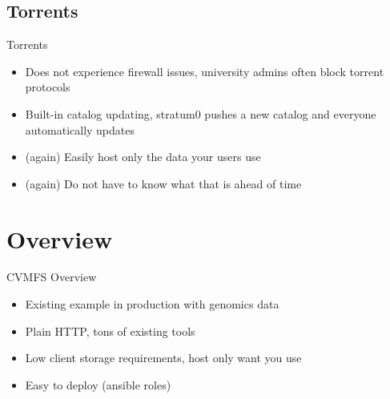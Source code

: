 \documentclass[12pt]{ufrslides}
\begin{document}
\subsection{Torrents}
\begin{frame}{Torrents}
	\begin{itemize}
		\item Does not experience firewall issues, university admins often block torrent protocols
		\item Built-in catalog updating, stratum0 pushes a new catalog and everyone automatically updates
		\item (again) Easily host only the data your users use
		\item (again) Do not have to know what that is ahead of time
	\end{itemize}
\end{frame}

\section{Overview}
\begin{frame}{CVMFS Overview}
	\begin{itemize}
		\item Existing example in production with genomics data
		\item Plain HTTP, tons of existing tools
		\item Low client storage requirements, host only want you use
		\item Easy to deploy (ansible roles)
	\end{itemize}
\end{frame}
\end{document}
